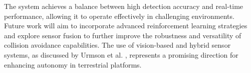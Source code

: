 \documentclass[12pt]{article}
\begin{document}
The system achieves a balance between high detection accuracy and real-time performance, allowing it to operate effectively in challenging environments. Future work will aim to incorporate advanced reinforcement learning strategies and explore sensor fusion to further improve the robustness and versatility of collision avoidance capabilities. The use of vision-based and hybrid sensor systems, as discussed by Urmson et al. \cite{urmson2006robust}, represents a promising direction for enhancing autonomy in terrestrial platforms.

\newpage


\end{document}
